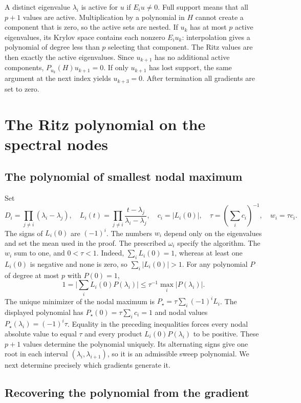 \documentclass[11pt,a4paper]{article}
\numberwithin{equation}{section}
\newcommand{\abs}[1]{\lvert #1\rvert}
\begin{document}
A distinct eigenvalue \(\lambda_i\) is active for \(u\) if \(E_i u\ne0\). Full support means that all \(p+1\) values are active. Multiplication by a polynomial in \(H\) cannot create a component that is zero, so the active sets are nested. If \(u_k\) has at most \(p\) active eigenvalues, its Krylov space contains each nonzero \(E_i u_k\): interpolation gives a polynomial of degree less than \(p\) selecting that component. The Ritz values are then exactly the active eigenvalues. Since \(u_{k+1}\) has no additional active components, \(P_{u_k}(H)u_{k+1}=0\). If only \(u_{k+1}\) has lost support, the same argument at the next index yields \(u_{k+3}=0\). After termination all gradients are set to zero.

\section{The Ritz polynomial on the spectral nodes}\label{sec:polynomial}

\subsection{The polynomial of smallest nodal maximum}

Set
\[
 D_i=\prod_{j\ne i}(\lambda_i-\lambda_j),\quad
 L_i(t)=\prod_{j\ne i}\frac{t-\lambda_j}{\lambda_i-\lambda_j},\quad
 c_i=\abs{L_i(0)},\quad
 \tau=(\textstyle\sum_i c_i)^{-1},\quad
 w_i=\tau c_i .
\]
The signs of \(L_i(0)\) are \((-1)^i\). The numbers \(w_i\) depend only on the eigenvalues and set the mean used in the proof. The prescribed \(\omega_i\) specify the algorithm. The \(w_i\) sum to one, and \(0<\tau<1\). Indeed, \(\sum_iL_i(0)=1\), whereas at least
one \(L_i(0)\) is negative and none is zero, so \(\sum_i|L_i(0)|>1\). For any polynomial \(P\) of degree at most \(p\) with \(P(0)=1\),
\[
  1=\abs{\textstyle\sum_iL_i(0)P(\lambda_i)}
    \le\tau^{-1}\max_i\abs{P(\lambda_i)} .
\]
The unique minimizer of the nodal maximum is \(P_\star=\tau\sum_i(-1)^iL_i\). The displayed polynomial has \(P_\star(0)=\tau\sum_i c_i=1\)
and nodal values \(P_\star(\lambda_i)=(-1)^i\tau\).
Equality in the preceding inequalities forces every nodal absolute
value to equal \(\tau\) and every product \(L_i(0)P(\lambda_i)\) to
be positive. These \(p+1\) values determine the polynomial uniquely.
Its alternating signs give one root in each interval
\((\lambda_i,\lambda_{i+1})\), so it is an admissible sweep
polynomial. We next determine precisely which gradients generate it.

\subsection{Recovering the polynomial from the gradient}
\end{document}
